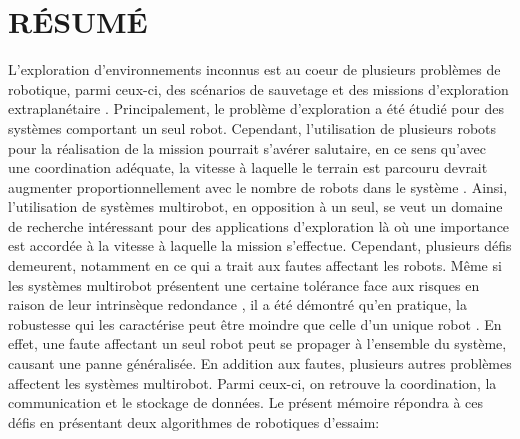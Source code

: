 

\chapter*{RÉSUMÉ}\thispagestyle{headings}

L'exploration d'environnements inconnus est au coeur de plusieurs problèmes de robotique, parmi ceux-ci, des scénarios de sauvetage \cite{matos2016multiple} et des missions d'exploration extraplanétaire \cite{fong2005interaction}. Principalement, le problème d'exploration a été étudié pour des systèmes comportant un seul robot. Cependant, l'utilisation de plusieurs robots pour la réalisation de la mission pourrait s'avérer salutaire, en ce sens qu'avec une coordination adéquate, la vitesse à laquelle le terrain est parcouru devrait augmenter proportionnellement avec le nombre de robots dans le système \cite{burgard2005coordinated}. Ainsi, l'utilisation de systèmes multirobot, en opposition à un seul, se veut un domaine de recherche intéressant pour des applications d'exploration là où une importance est accordée à la vitesse à laquelle la mission s'effectue. Cependant, plusieurs défis demeurent, notamment en ce qui a trait aux fautes affectant les robots. Même si les systèmes multirobot présentent une certaine tolérance face aux risques en raison de leur intrinsèque redondance \cite{ramachandran2019resilience,wehbe2021probabilistic,winfield2006safety}, il a été démontré qu'en pratique, la robustesse qui les caractérise peut être moindre que celle d'un unique robot \cite{winfield2006safety}. En effet, une faute affectant un seul robot peut se propager à l'ensemble du système, causant une panne généralisée. En addition aux fautes, plusieurs autres problèmes affectent les systèmes multirobot. Parmi ceux-ci, on retrouve la coordination, la communication et le stockage de données. Le présent mémoire répondra à ces défis en présentant deux algorithmes de robotiques d'essaim:

